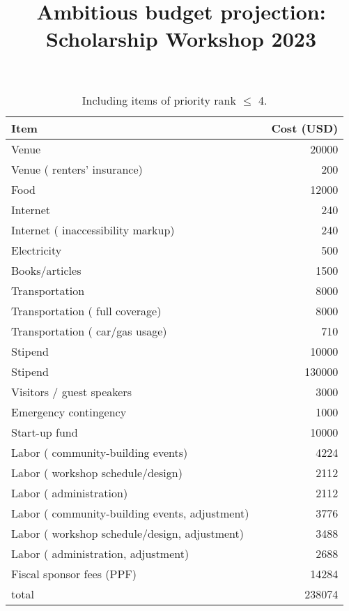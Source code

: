\documentclass[10pt]{article}
\title{Ambitious budget projection: Scholarship Workshop 2023}
\date{}
\begin{document}
\maketitle

\vspace{-1pc}

\begin{table}[h]
\begin{center}
\begin{tabular}{llr}
Item &  & Cost (USD) \\ \hline
Venue &  & 20000 \\
Venue ( renters' insurance) &  & 200 \\
Food &  & 12000 \\
Internet &  & 240 \\
Internet ( inaccessibility markup) &  & 240 \\
Electricity &  & 500 \\
Books/articles &  & 1500 \\
Transportation &  & 8000 \\
Transportation ( full coverage) &  & 8000 \\
Transportation ( car/gas usage) &  & 710 \\
Stipend &  & 10000 \\
Stipend &  & 130000 \\
Visitors / guest speakers &  & 3000 \\
Emergency contingency &  & 1000 \\
Start-up fund &  & 10000 \\
Labor ( community-building events) &  & 4224 \\
Labor ( workshop schedule/design) &  & 2112 \\
Labor ( administration) &  & 2112 \\
Labor ( community-building events, adjustment) &  & 3776 \\
Labor ( workshop schedule/design, adjustment) &  & 3488 \\
Labor ( administration, adjustment) &  & 2688 \\
Fiscal sponsor fees (PPF) &  & 14284 \\ \hline
total &  & 238074
\end{tabular}
\end{center}
\caption{Including items of priority rank $\leq$ 4.}\label{capcap}
\end{table}
\end{document}

